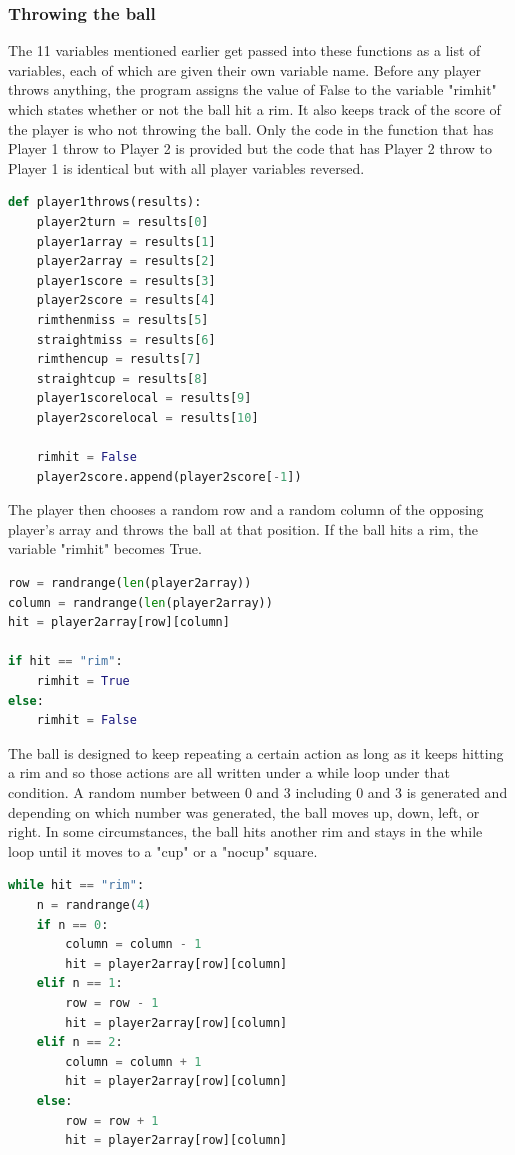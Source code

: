 \documentclass{article}
\begin{document}
\subsubsection{Throwing the ball}
The 11 variables mentioned earlier get passed into these functions as a list of variables, each of which are given their own variable name. Before any player throws anything, the program assigns the value of False to the variable "rimhit" which states whether or not the ball hit a rim. It also keeps track of the score of the player is who not throwing the ball. Only the code in the function that has Player 1 throw to Player 2 is provided but the code that has Player 2 throw to Player 1 is identical but with all player variables reversed.
\begin{lstlisting}[language=Python]
def player1throws(results):
    player2turn = results[0]
    player1array = results[1]
    player2array = results[2]
    player1score = results[3]
    player2score = results[4]
    rimthenmiss = results[5]
    straightmiss = results[6]
    rimthencup = results[7]
    straightcup = results[8]
    player1scorelocal = results[9]
    player2scorelocal = results[10]

    rimhit = False
    player2score.append(player2score[-1])
\end{lstlisting} 

The player then chooses a random row and a random column of the opposing player's array and throws the ball at that position. If the ball hits a rim, the variable "rimhit" becomes True.
\begin{lstlisting}[language=Python]
row = randrange(len(player2array))
column = randrange(len(player2array))
hit = player2array[row][column]

if hit == "rim":
    rimhit = True
else:
    rimhit = False
\end{lstlisting} 

The ball is designed to keep repeating a certain action as long as it keeps hitting a rim and so those actions are all written under a while loop under that condition. A random number between 0 and 3 including 0 and 3 is generated and depending on which number was generated, the ball moves up, down, left, or right. In some circumstances, the ball hits another rim and stays in the while loop until it moves to a "cup" or a "nocup" square.

\begin{lstlisting}[language=Python]
while hit == "rim":
    n = randrange(4)
    if n == 0:
        column = column - 1
        hit = player2array[row][column]
    elif n == 1:
        row = row - 1
        hit = player2array[row][column]
    elif n == 2:
        column = column + 1
        hit = player2array[row][column]
    else:
        row = row + 1
        hit = player2array[row][column]
\end{lstlisting}
\end{document}
